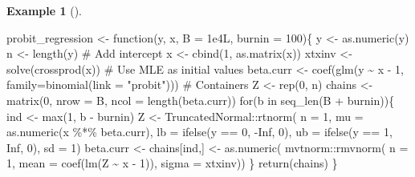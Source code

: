 \documentclass[
  11pt,
  letterpaper,
]{scrbook}
\newenvironment{Shaded}{\begin{snugshade}}{\end{snugshade}}
\newcommand{\AttributeTok}[1]{\textcolor[rgb]{0.40,0.45,0.13}{#1}}
\newcommand{\CommentTok}[1]{\textcolor[rgb]{0.37,0.37,0.37}{#1}}
\newcommand{\ConstantTok}[1]{\textcolor[rgb]{0.56,0.35,0.01}{#1}}
\newcommand{\ControlFlowTok}[1]{\textcolor[rgb]{0.00,0.23,0.31}{#1}}
\newcommand{\DecValTok}[1]{\textcolor[rgb]{0.68,0.00,0.00}{#1}}
\newcommand{\FloatTok}[1]{\textcolor[rgb]{0.68,0.00,0.00}{#1}}
\newcommand{\FunctionTok}[1]{\textcolor[rgb]{0.28,0.35,0.67}{#1}}
\newcommand{\NormalTok}[1]{\textcolor[rgb]{0.00,0.23,0.31}{#1}}
\newcommand{\OtherTok}[1]{\textcolor[rgb]{0.00,0.23,0.31}{#1}}
\newcommand{\SpecialCharTok}[1]{\textcolor[rgb]{0.37,0.37,0.37}{#1}}
\newcommand{\StringTok}[1]{\textcolor[rgb]{0.13,0.47,0.30}{#1}}
\theoremstyle{definition}
\newtheorem{example}{Example}[chapter]
\theoremstyle{definition}
\theoremstyle{definition}
\theoremstyle{plain}
\theoremstyle{remark}
\begin{document}
\begin{example}[]
\begin{Shaded}
\begin{Highlighting}[]
\NormalTok{probit\_regression }\OtherTok{\textless{}{-}} \ControlFlowTok{function}\NormalTok{(y, x, }\AttributeTok{B =} \FloatTok{1e4}\NormalTok{L, }\AttributeTok{burnin =} \DecValTok{100}\NormalTok{)\{}
\NormalTok{  y }\OtherTok{\textless{}{-}} \FunctionTok{as.numeric}\NormalTok{(y)}
\NormalTok{  n }\OtherTok{\textless{}{-}} \FunctionTok{length}\NormalTok{(y)}
  \CommentTok{\# Add intercept}
\NormalTok{  x }\OtherTok{\textless{}{-}} \FunctionTok{cbind}\NormalTok{(}\DecValTok{1}\NormalTok{, }\FunctionTok{as.matrix}\NormalTok{(x))}
\NormalTok{  xtxinv }\OtherTok{\textless{}{-}} \FunctionTok{solve}\NormalTok{(}\FunctionTok{crossprod}\NormalTok{(x))}
  \CommentTok{\# Use MLE as initial values}
\NormalTok{  beta.curr }\OtherTok{\textless{}{-}} \FunctionTok{coef}\NormalTok{(}\FunctionTok{glm}\NormalTok{(y }\SpecialCharTok{\textasciitilde{}}\NormalTok{ x }\SpecialCharTok{{-}} \DecValTok{1}\NormalTok{, }\AttributeTok{family=}\FunctionTok{binomial}\NormalTok{(}\AttributeTok{link =} \StringTok{"probit"}\NormalTok{)))}
  \CommentTok{\# Containers}
\NormalTok{  Z }\OtherTok{\textless{}{-}} \FunctionTok{rep}\NormalTok{(}\DecValTok{0}\NormalTok{, n)}
\NormalTok{  chains }\OtherTok{\textless{}{-}} \FunctionTok{matrix}\NormalTok{(}\DecValTok{0}\NormalTok{, }\AttributeTok{nrow =}\NormalTok{ B, }\AttributeTok{ncol =} \FunctionTok{length}\NormalTok{(beta.curr))}
  \ControlFlowTok{for}\NormalTok{(b }\ControlFlowTok{in} \FunctionTok{seq\_len}\NormalTok{(B }\SpecialCharTok{+}\NormalTok{ burnin))\{}
\NormalTok{    ind }\OtherTok{\textless{}{-}} \FunctionTok{max}\NormalTok{(}\DecValTok{1}\NormalTok{, b }\SpecialCharTok{{-}}\NormalTok{ burnin)}
\NormalTok{    Z }\OtherTok{\textless{}{-}}\NormalTok{ TruncatedNormal}\SpecialCharTok{::}\FunctionTok{rtnorm}\NormalTok{(}
      \AttributeTok{n =} \DecValTok{1}\NormalTok{,}
      \AttributeTok{mu =} \FunctionTok{as.numeric}\NormalTok{(x }\SpecialCharTok{\%*\%}\NormalTok{ beta.curr),}
      \AttributeTok{lb =} \FunctionTok{ifelse}\NormalTok{(y }\SpecialCharTok{==} \DecValTok{0}\NormalTok{, }\SpecialCharTok{{-}}\ConstantTok{Inf}\NormalTok{, }\DecValTok{0}\NormalTok{),}
      \AttributeTok{ub =} \FunctionTok{ifelse}\NormalTok{(y }\SpecialCharTok{==} \DecValTok{1}\NormalTok{, }\ConstantTok{Inf}\NormalTok{, }\DecValTok{0}\NormalTok{),}
      \AttributeTok{sd =} \DecValTok{1}\NormalTok{)}
\NormalTok{    beta.curr }\OtherTok{\textless{}{-}}\NormalTok{ chains[ind,] }\OtherTok{\textless{}{-}} \FunctionTok{as.numeric}\NormalTok{(}
\NormalTok{      mvtnorm}\SpecialCharTok{::}\FunctionTok{rmvnorm}\NormalTok{(}
        \AttributeTok{n =} \DecValTok{1}\NormalTok{, }
        \AttributeTok{mean =} \FunctionTok{coef}\NormalTok{(}\FunctionTok{lm}\NormalTok{(Z }\SpecialCharTok{\textasciitilde{}}\NormalTok{ x }\SpecialCharTok{{-}} \DecValTok{1}\NormalTok{)),}
        \AttributeTok{sigma =}\NormalTok{ xtxinv))}
\NormalTok{  \}}
\FunctionTok{return}\NormalTok{(chains)}
\NormalTok{\}}
\end{Highlighting}
\end{Shaded}

\end{example}
\end{document}
